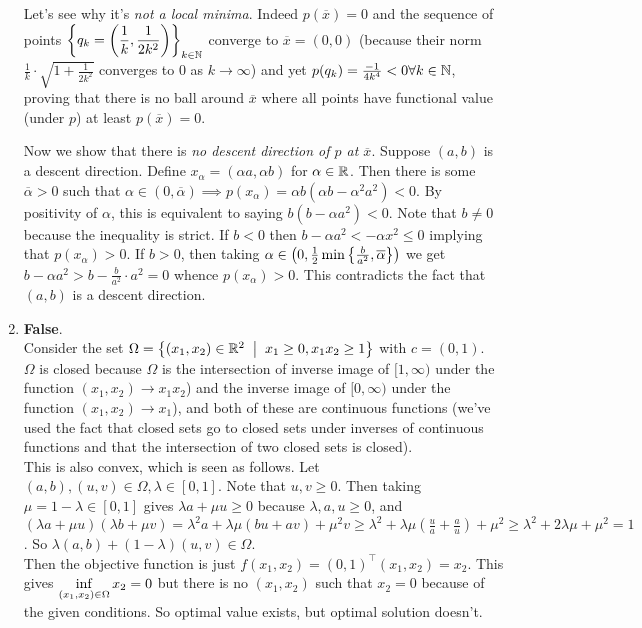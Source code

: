 \begin{enumerate}[leftmargin=*]
Let's see why it's \textit{not a local minima}. Indeed $p(\overline x) = 0$ and the sequence of points $\displaystyle\left\{q_k=\left(\frac{1}{k},\frac{1}{2k^2}\right)\right\}_{k\in\mathbb{N}}$ converge to $\overline x = (0,0)$ (because their norm $\frac{1}{k}\cdot \sqrt{1+\frac{1}{2k^2}}$ converges to $0$ as $k\to\infty$) and yet $p(q_k) = \frac{-1}{4k^4}<0\forall k\in\mathbb{N}$, proving that there is no ball around $\overline x$ where all points have functional value (under $p$) at least $p(\overline x) = 0$.

Now we show that there is \textit{no descent direction of $p$ at $\overline x$}. Suppose $(a,b)$ is a descent direction. Define $x_\alpha = (\alpha a,\alpha b)$ for $\alpha\in \mathbb{R}$. Then there is some $\overline \alpha>0$ such that $\alpha\in(0,\overline \alpha)\implies p(x_\alpha) = \alpha b(\alpha b-\alpha^2a^2)<0$. By positivity of $\alpha$, this is equivalent to saying $b(b-\alpha a^2)<0$. Note that $b\neq 0$ because the inequality is strict. If $b<0$ then $b-\alpha a^2 < -\alpha x^2 \leq 0$ implying that $p(x_\alpha) > 0$. If $b>0$, then taking $\alpha\in \left(0,\frac{1}{2}\min\left\{\frac{b}{a^2},\overline \alpha\right\}\right)$ we get $b-\alpha a^2 > b-\frac{b}{a^2}\cdot a^2 = 0$ whence $p(x_\alpha)>0$. This contradicts the fact that $(a,b)$ is a descent direction.

\item \textbf{False}.\\
Consider the set $\Omega = \set{(x_1,x_2)\in \R^2\st x_1\geq0, x_1x_2\geq 1}$ with $c=(0,1)$. \\
$\Omega$ is closed because $\Omega$ is the intersection of inverse image of $[1,\infty)$ under the function $(x_1,x_2)\to x_1x_2$) and the inverse image of $[0,\infty)$ under the function $(x_1,x_2)\to x_1$), and both of these are continuous functions (we've used the fact that closed sets go to closed sets under inverses of continuous functions and that the intersection of two closed sets is closed). \\
This is also convex, which is seen as follows. Let $(a,b),(u,v)\in \Omega, \lambda\in[0,1]$. Note that $u,v\geq 0$. Then taking $\mu=1-\lambda\in[0,1]$ gives $\lambda a + \mu u \geq 0$ because $\lambda,a,u\geq 0$, and $(\lambda a + \mu u)(\lambda b + \mu v) = \lambda^2 a + \lambda\mu(bu+av) + \mu^2 v \geq \lambda^2 + \lambda\mu\left(\frac{u}{a} + \frac{a}{u}\right) + \mu^2 \ge \lambda^2 + 2\lambda\mu + \mu^2 = 1$. So $\lambda (a,b) + (1-\lambda)(u,v) \in\Omega$.\\
Then the objective function is just $f(x_1,x_2) = (0,1)^\top(x_1,x_2) = x_2$. This gives $\displaystyle\inf_{(x_1,x_2)\in\Omega} x_2 = 0$ but there is no $(x_1,x_2)$ such that $x_2=0$ because of the given conditions. So optimal value exists, but optimal solution doesn't.
\end{enumerate}

